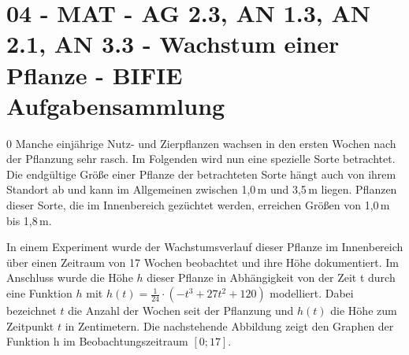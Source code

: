 \section{04 - MAT - AG 2.3, AN 1.3, AN 2.1, AN 3.3 - Wachstum einer Pflanze - BIFIE Aufgabensammlung}

\begin{langesbeispiel} \item[0] %
Manche einjährige Nutz- und Zierpflanzen wachsen in den ersten Wochen nach der Pflanzung sehr rasch. Im Folgenden wird nun eine spezielle Sorte betrachtet. Die endgültige Größe einer
Pflanze der betrachteten Sorte hängt auch von ihrem Standort ab und kann im Allgemeinen zwischen 1,0\,m und 3,5\,m liegen. Pflanzen dieser Sorte, die im Innenbereich gezüchtet werden,
erreichen Größen von 1,0\,m bis 1,8\,m. 

In einem Experiment wurde der Wachstumsverlauf dieser Pflanze im Innenbereich über einen Zeitraum von 17 Wochen beobachtet und ihre Höhe dokumentiert. Im Anschluss wurde die
Höhe $h$ dieser Pflanze in Abhängigkeit von der Zeit t durch eine Funktion $h$ mit $h(t) = \frac{1}{24}\cdot \left(-t^3+27t^2+120\right)$ modelliert. Dabei bezeichnet $t$ die Anzahl der Wochen seit der Pflanzung und $h(t)$ die Höhe zum Zeitpunkt $t$ in Zentimetern. Die nachstehende Abbildung zeigt den Graphen der Funktion h im Beobachtungszeitraum $[0; 17]$.

\begin{center}
\end{center}


\end{langesbeispiel}
